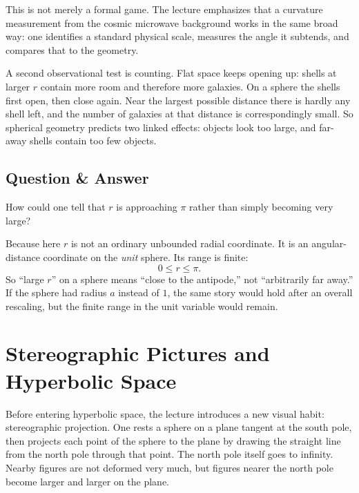 This is not merely a formal game. The lecture emphasizes that a curvature measurement from the cosmic microwave background works in the same broad way: one identifies a standard physical scale, measures the angle it subtends, and compares that to the geometry.

A second observational test is counting. Flat space keeps opening up: shells at larger \(r\) contain more room and therefore more galaxies. On a sphere the shells first open, then close again. Near the largest possible distance there is hardly any shell left, and the number of galaxies at that distance is correspondingly small. So spherical geometry predicts two linked effects: objects look too large, and far-away shells contain too few objects.

\subsection{Question \& Answer}

How could one tell that \(r\) is approaching \(\pi\) rather than simply becoming very large?

Because here \(r\) is not an ordinary unbounded radial coordinate. It is an angular-distance coordinate on the \emph{unit} sphere. Its range is finite:
\[
0 \le r \le \pi.
\]
So ``large \(r\)'' on a sphere means ``close to the antipode,'' not ``arbitrarily far away.'' If the sphere had radius \(a\) instead of \(1\), the same story would hold after an overall rescaling, but the finite range in the unit variable would remain.

\section{Stereographic Pictures and Hyperbolic Space}

Before entering hyperbolic space, the lecture introduces a new visual habit: stereographic projection. One rests a sphere on a plane tangent at the south pole, then projects each point of the sphere to the plane by drawing the straight line from the north pole through that point. The north pole itself goes to infinity. Nearby figures are not deformed very much, but figures nearer the north pole become larger and larger on the plane.

